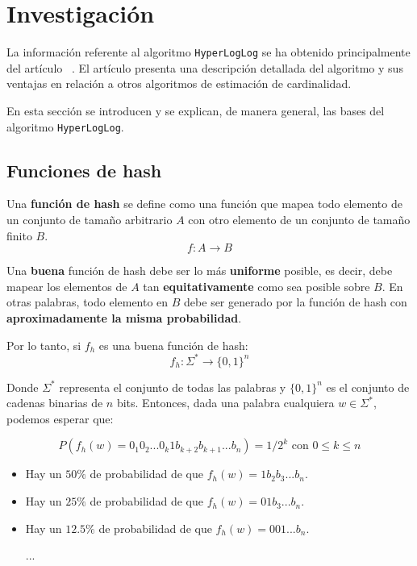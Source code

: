 % 
\section{Investigación}

La información referente al algoritmo \texttt{HyperLogLog} se ha obtenido principalmente
del artículo  ~\cite{hll:HyperLogLog}.
El artículo presenta una descripción detallada del algoritmo y sus ventajas en relación a otros
algoritmos de estimación de cardinalidad.

En esta sección se introducen y se explican, de manera general, las bases del algoritmo \texttt{HyperLogLog}.

\subsection{Funciones de hash}

Una \textbf{función de hash} se define como una función que mapea todo elemento de un
conjunto de tamaño arbitrario $A$ con otro elemento de un conjunto de tamaño finito $B$.
$$f: A \rightarrow B$$

Una \textbf{buena} función de hash debe ser lo más \textbf{uniforme} posible, es decir, debe mapear los elementos de
$A$ tan \textbf{equitativamente} como sea posible sobre $B$. En otras palabras, todo elemento en $B$ debe ser generado
por la función de hash con \textbf{aproximadamente la misma probabilidad}.

Por lo tanto, si $f_h$ es una buena función de hash:
$$f_h: \Sigma^* \rightarrow \{0,1\}^n$$

Donde $\Sigma^*$ representa el conjunto de todas las palabras y $\{0, 1\}^n$ es el conjunto de cadenas binarias de $n$ bits.
Entonces, dada una palabra cualquiera $w \in \Sigma^*$, podemos esperar que:

$$P( f_h(w) = 0_1 0_2 ... 0_k 1 b_{k+2} b_{k+1} ... b_n ) = 1 / 2^k \text{ con } 0 \leq k \leq n$$

\begin{itemize}
\item Hay un $50\%$ de probabilidad de que $f_h(w) = 1 b_2 b_3 ... b_n$.
\item Hay un $25\%$ de probabilidad de que $f_h(w) = 0 1 b_3 ... b_n$.
\item Hay un $12.5\%$ de probabilidad de que $f_h(w) = 0 0 1 ... b_n$.
\item [...]
\end{itemize}

